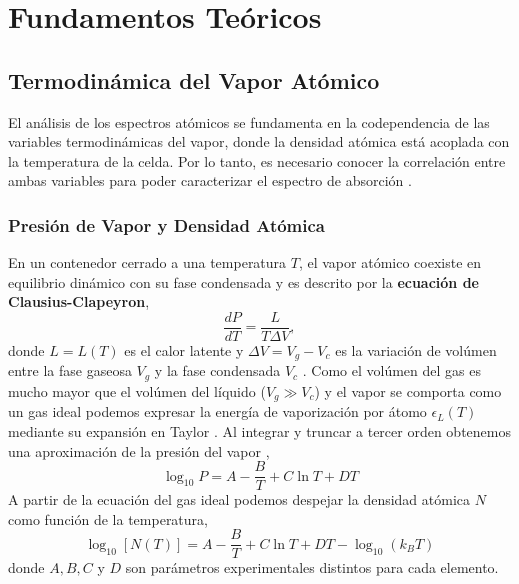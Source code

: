 \chapter{Fundamentos Teóricos}
\section{Termodinámica del Vapor Atómico}
El análisis de los espectros atómicos se fundamenta en la codependencia de las variables termodinámicas del vapor, donde la densidad atómica está acoplada con la temperatura de la celda. Por lo tanto, es necesario conocer la correlación entre ambas variables para poder caracterizar el espectro de absorción \cite{demtroderLaserSpectroscopy1996, diegosierracostaDeterminacionDensidadAtomica}.
\subsection{Presión de Vapor y Densidad Atómica}
En un contenedor cerrado a una temperatura $T$, el vapor atómico coexiste en equilibrio dinámico con su fase condensada y es descrito por la \textbf{ecuación de Clausius-Clapeyron},
\begin{equation*}
    \frac{dP}{dT} = \frac{L}{T \Delta V},
\end{equation*}
donde $L = L(T)$ es el calor latente y $\Delta V = V_g - V_c$ es la variación de volúmen entre la fase gaseosa $V_g$ y la fase condensada $V_c$ \cite{kittelThermalPhysics1980, alcockVapourPressureEquations1984}. Como el volúmen del gas es mucho mayor que el volúmen del líquido ($V_g \gg V_c$) y el vapor se comporta como un gas ideal podemos expresar la energía de vaporización por átomo  $\epsilon_L (T)$ mediante su expansión en Taylor \cite{danieladamsteckrubidium85Dlinedata, danieladamsteckrubidium87Dlinedata,demtroderLaserSpectroscopy1996}. Al integrar y truncar a tercer orden obtenemos una aproximación de la presión del vapor \cite{alcockVapourPressureEquations1984, nesmeyanovVapourPressureElements},
\begin{equation*}
    \log_{10} P = A - \frac{B}{T} + C \ln T + D T
\end{equation*}
A partir de la ecuación del gas ideal podemos despejar la densidad atómica $N$ como función de la temperatura,
\begin{equation}
    \boxed{
    \log_{10} [N(T)] = A - \frac{B}{T} + C \ln T + D T - \log_{10} (k_B T)
    }
\end{equation}
donde $A, B, C$ y $D$ son parámetros experimentales distintos para cada elemento.
